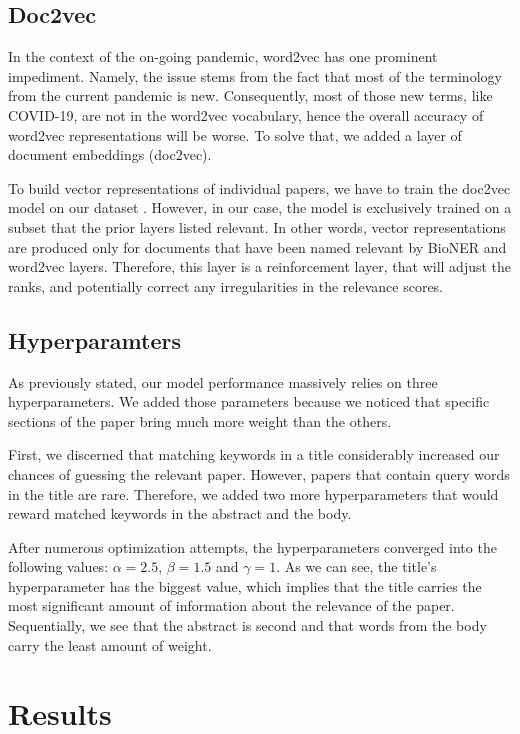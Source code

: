 \documentclass[10pt, a4paper]{article}
\begin{document}
	\subsection{Doc2vec}
	
In the context of the on-going pandemic, word2vec has one prominent impediment. Namely, the issue stems from the fact that most of the terminology from the current pandemic is new. Consequently, most of those new terms, like COVID-19, are not in the word2vec vocabulary, hence the overall accuracy of word2vec representations will be worse. To solve that, we added a layer of document embeddings (doc2vec). 

To build vector representations of individual papers, we have to train the doc2vec model on our dataset \cite{le2014distributed}. However, in our case, the model is exclusively trained on a subset that the prior layers listed relevant. In other words, vector representations are produced only for documents that have been named relevant by BioNER and word2vec layers. Therefore, this layer is a reinforcement layer, that will adjust the ranks, and potentially correct any irregularities in the relevance scores.

\subsection{Hyperparamters}

As previously stated, our model performance massively relies on three hyperparameters. We added those parameters because we noticed that specific sections of the paper bring much more weight than the others. 

First, we discerned that matching keywords in a title considerably increased our chances of guessing the relevant paper. However, papers that contain query words in the title are rare. Therefore, we added two more hyperparameters that would reward matched keywords in the abstract and the body. 

After numerous optimization attempts, the hyperparameters converged into the following values: $\alpha = 2.5$, $\beta = 1.5$ and $\gamma = 1$. As we can see, the title's hyperparameter has the biggest value, which implies that the title carries the most significant amount of information about the relevance of the paper. Sequentially, we see that the abstract is second and that words from the body carry the least amount of weight.


	
	\section{Results}
	
\end{document}
